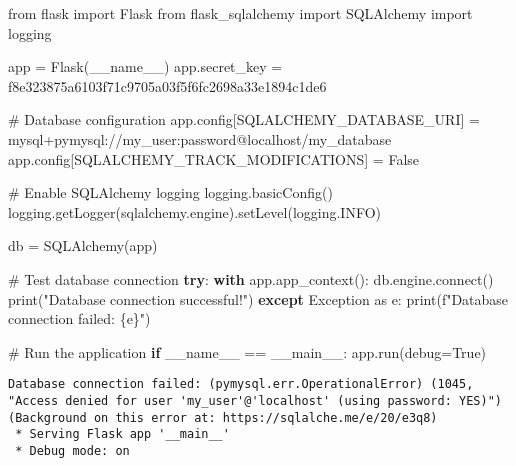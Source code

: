 \documentclass[
  letterpaper,
  DIV=11,
  numbers=noendperiod]{scrreprt}
\newenvironment{Shaded}{\begin{snugshade}}{\end{snugshade}}
\newcommand{\BuiltInTok}[1]{\textcolor[rgb]{0.00,0.23,0.31}{#1}}
\newcommand{\CommentTok}[1]{\textcolor[rgb]{0.37,0.37,0.37}{#1}}
\newcommand{\ControlFlowTok}[1]{\textcolor[rgb]{0.00,0.23,0.31}{\textbf{#1}}}
\newcommand{\ExtensionTok}[1]{\textcolor[rgb]{0.00,0.23,0.31}{#1}}
\newcommand{\ImportTok}[1]{\textcolor[rgb]{0.00,0.46,0.62}{#1}}
\newcommand{\NormalTok}[1]{\textcolor[rgb]{0.00,0.23,0.31}{#1}}
\newcommand{\OperatorTok}[1]{\textcolor[rgb]{0.37,0.37,0.37}{#1}}
\newcommand{\PreprocessorTok}[1]{\textcolor[rgb]{0.68,0.00,0.00}{#1}}
\newcommand{\SpecialCharTok}[1]{\textcolor[rgb]{0.37,0.37,0.37}{#1}}
\newcommand{\SpecialStringTok}[1]{\textcolor[rgb]{0.13,0.47,0.30}{#1}}
\newcommand{\StringTok}[1]{\textcolor[rgb]{0.13,0.47,0.30}{#1}}
\newcommand{\VariableTok}[1]{\textcolor[rgb]{0.07,0.07,0.07}{#1}}
\begin{document}
\begin{Shaded}
\begin{Highlighting}[]
\ImportTok{from}\NormalTok{ flask }\ImportTok{import}\NormalTok{ Flask}
\ImportTok{from}\NormalTok{ flask\_sqlalchemy }\ImportTok{import}\NormalTok{ SQLAlchemy}
\ImportTok{import}\NormalTok{ logging}

\NormalTok{app }\OperatorTok{=}\NormalTok{ Flask(}\VariableTok{\_\_name\_\_}\NormalTok{)}
\NormalTok{app.secret\_key }\OperatorTok{=} \StringTok{\textquotesingle{}f8e323875a6103f71c9705a03f5f6fc2698a33e1894c1de6\textquotesingle{}}

\CommentTok{\# Database configuration}
\NormalTok{app.config[}\StringTok{\textquotesingle{}SQLALCHEMY\_DATABASE\_URI\textquotesingle{}}\NormalTok{] }\OperatorTok{=} \StringTok{\textquotesingle{}mysql+pymysql://my\_user:password@localhost/my\_database\textquotesingle{}}
\NormalTok{app.config[}\StringTok{\textquotesingle{}SQLALCHEMY\_TRACK\_MODIFICATIONS\textquotesingle{}}\NormalTok{] }\OperatorTok{=} \VariableTok{False}

\CommentTok{\# Enable SQLAlchemy logging}
\NormalTok{logging.basicConfig()}
\NormalTok{logging.getLogger(}\StringTok{\textquotesingle{}sqlalchemy.engine\textquotesingle{}}\NormalTok{).setLevel(logging.INFO)}

\NormalTok{db }\OperatorTok{=}\NormalTok{ SQLAlchemy(app)}

\CommentTok{\# Test database connection}
\ControlFlowTok{try}\NormalTok{:}
    \ControlFlowTok{with}\NormalTok{ app.app\_context():}
\NormalTok{        db.engine.}\ExtensionTok{connect}\NormalTok{()}
        \BuiltInTok{print}\NormalTok{(}\StringTok{"Database connection successful!"}\NormalTok{)}
\ControlFlowTok{except} \PreprocessorTok{Exception} \ImportTok{as}\NormalTok{ e:}
    \BuiltInTok{print}\NormalTok{(}\SpecialStringTok{f"Database connection failed: }\SpecialCharTok{\{}\NormalTok{e}\SpecialCharTok{\}}\SpecialStringTok{"}\NormalTok{)}

\CommentTok{\# Run the application}
\ControlFlowTok{if} \VariableTok{\_\_name\_\_} \OperatorTok{==} \StringTok{\textquotesingle{}\_\_main\_\_\textquotesingle{}}\NormalTok{:}
\NormalTok{    app.run(debug}\OperatorTok{=}\VariableTok{True}\NormalTok{)}
\end{Highlighting}
\end{Shaded}

\begin{verbatim}
Database connection failed: (pymysql.err.OperationalError) (1045, "Access denied for user 'my_user'@'localhost' (using password: YES)")
(Background on this error at: https://sqlalche.me/e/20/e3q8)
 * Serving Flask app '__main__'
 * Debug mode: on
\end{verbatim}
\end{document}

